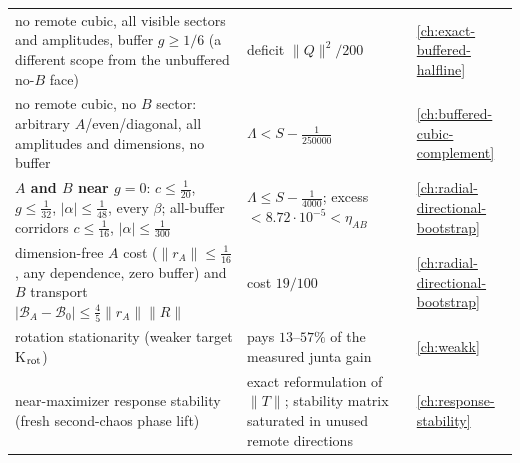 \begin{center}
\begin{tabular}{p{6.2cm}p{4.6cm}p{2.6cm}}
no remote cubic, all visible sectors and amplitudes, buffer $g\ge1/6$ (a different scope from the unbuffered no-$B$ face) & deficit $\|Q\|^2/200$ & \autoref{ch:exact-buffered-halfline}\\
no remote cubic, no $B$ sector: arbitrary $A$/even/diagonal, all amplitudes and dimensions, no buffer & $\Lambda<S-\tfrac1{250000}$ & \autoref{ch:buffered-cubic-complement}\\
\textbf{$A$ and $B$ near $g=0$}: $c\le\tfrac1{20}$, $g\le\tfrac1{32}$, $|\alpha|\le\tfrac1{48}$, every $\beta$; all-buffer corridors $c\le\tfrac1{16}$, $|\alpha|\le\tfrac1{300}$ & $\Lambda\le S-\tfrac1{4000}$; excess $<8.72\cdot10^{-5}<\eta_{AB}$ & \autoref{ch:radial-directional-bootstrap}\\
dimension-free $A$ cost ($\|r_A\|\le\tfrac1{16}$, any dependence, zero buffer) and $B$ transport $|\mathcal B_A-\mathcal B_0|\le\tfrac45\|r_A\|\|R\|$ & cost $19/100$ & \autoref{ch:radial-directional-bootstrap}\\
rotation stationarity (weaker target K$_{\rm rot}$) & pays $13$--$57\%$ of the measured junta gain & \autoref{ch:weakk}\\
near-maximizer response stability (fresh second-chaos phase lift) & exact reformulation of $\|T\|$; stability matrix saturated in unused remote directions & \autoref{ch:response-stability}\\\bottomrule
\end{tabular}
\end{center}

